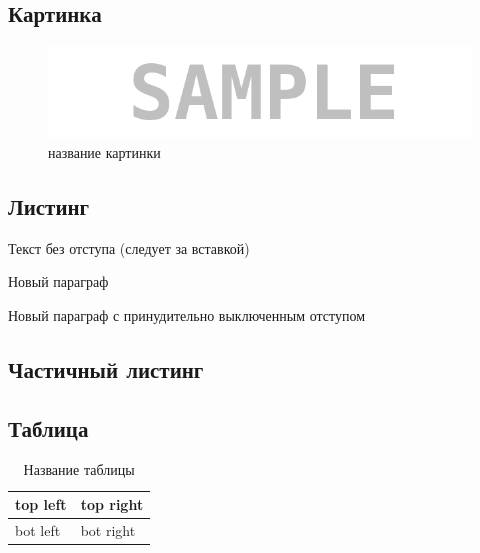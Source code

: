 \subsection{Картинка}

\begin{figure}[H]
	\begin{center}
		\includegraphics[scale=0.7]{pics/sample}
		\caption{название картинки} 
		\label{pic:pic_name} %
	\end{center}
\end{figure}


\subsection{Листинг}


\parindent=1cm %
Текст без отступа (следует за вставкой)

Новый параграф

\noindent Новый параграф с принудительно выключенным отступом


\subsection{Частичный листинг}
\makeatletter
\def\lst@PlaceNumber{\llap{\normalfont
                \lst@numberstyle{\the\lst@lineno}\kern\lst@numbersep}}
\makeatother


\parindent=1cm

\subsection{Таблица}

\begin{table}[H]
	\caption{Название таблицы}
	\begin{center}
		\begin{tabular}{|l|l|}
			\hline
			top left & top right\\ \hline
			bot left & bot right\\ \hline
	\end{tabular}
		\label{tabular:tab_examp}
	\end{center}
\end{table}

